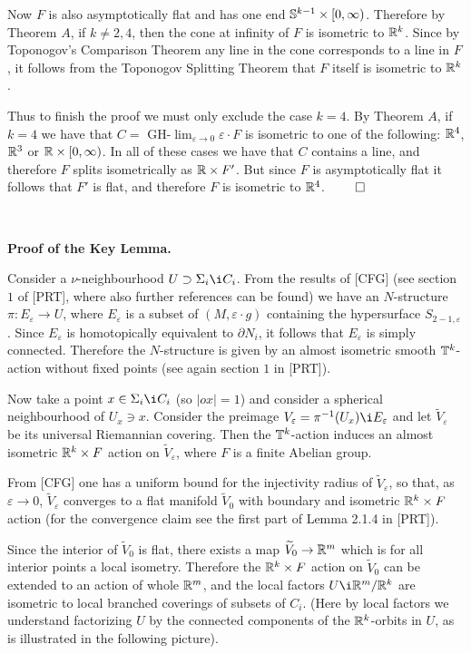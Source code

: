 Now $F$ is also asymptotically flat
and has one end ${\Bbb S}^{k-1}\times [0,\infty)$.
Therefore by Theorem $A$, if $k\ne 2,4$, then the cone at infinity of $F$
is isometric to ${\Bbb R}^k$. 
Since by Toponogov's Comparison Theorem
any line in the cone corresponds to a line
in $F$, it follows from the Toponogov Splitting Theorem
that $F$ itself is isometric to ${\Bbb R}^k$.

Thus to finish the proof we must only exclude the case $k=4$.
By Theorem $A$, if $k=4$ we have that $C=$ 
GH-$\lim_{\varepsilon\to 0} \varepsilon{\cdot} F$ is isometric to one of the following:
${\Bbb R}^4$, ${\Bbb R}^3$ or ${\Bbb R}\times [0,\infty)$.
In all of these cases we have
that $C$ contains a line, and therefore $F$ splits isometrically as 
${\Bbb R}\times F'$.
But since $F$ is asymptotically flat it follows that $F'$ is flat,
and therefore $F$ is isometric to ${\Bbb R}^4$. $\qed$

\ 


\noindent
{\bf Proof of the Key Lemma.} 

Consider a $\nu$-neighbourhood $U\supset \Sigma_i\i C_i$.  
From the results of [CFG] (see section $1$ of [PRT], where also further
references can be found)
we have an $N$-structure 
$\pi\colon  E_\varepsilon\to U$, where  
$E_\varepsilon$ is a subset of $(M, \varepsilon{\cdot} g)$
containing the hypersurface $S_{2-1,\varepsilon}$.  
Since $E_\varepsilon$ is homotopically equivalent to $\partial N_i$,  
it follows that $E_\varepsilon$ is simply connected.
Therefore the $N$-structure is given by
an almost isometric smooth ${\Bbb T}^k$-action without fixed points 
(see again section $1$ in [PRT]).

Now take a 
point $x\in \Sigma_i\i C_i$ (so $|ox|=1$) and consider a spherical  
neighbourhood of $U_x\ni x$.  
Consider the preimage $V_\varepsilon=\pi^{-1}(U_x)\i E_\varepsilon$ and let   
$\widetilde V_\varepsilon$ be its universal Riemannian covering. 
Then the ${\Bbb T}^k$-action induces an almost isometric ${\Bbb R}^k\times F$ action on  
$\widetilde V_\varepsilon$, where $F$ is a finite 
Abelian group.  

From [CFG] one has a uniform bound for  
the injectivity radius of $\widetilde V_\varepsilon$, so that,  
as $\varepsilon\to 0$, 
$\widetilde V_\varepsilon$ converges to a flat manifold $\widetilde V_0$ 
with boundary and isometric ${\Bbb R}^k\times F$ action 
(for the convergence claim see the first part of Lemma 2.1.4 in [PRT]).
 
 
Since the interior of $\widetilde V_0$ is flat,  
there exists a map $\widetilde V_0\to {\Bbb R}^m$ 
which is for all interior points a local isometry.  
Therefore the ${\Bbb R}^k\times F$ action on 
$\widetilde V_0$ can be extended to an action of whole ${\Bbb R}^m$, 
and the local factors $U\i \RR^m/\RR^k$ are isometric to local 
branched coverings of subsets of $C_i$.  
(Here by local  
factors we understand factorizing $U$ by the connected components  
of the ${\Bbb R}^k$-orbits  
in $U$, as is illustrated in the following picture). 
 
